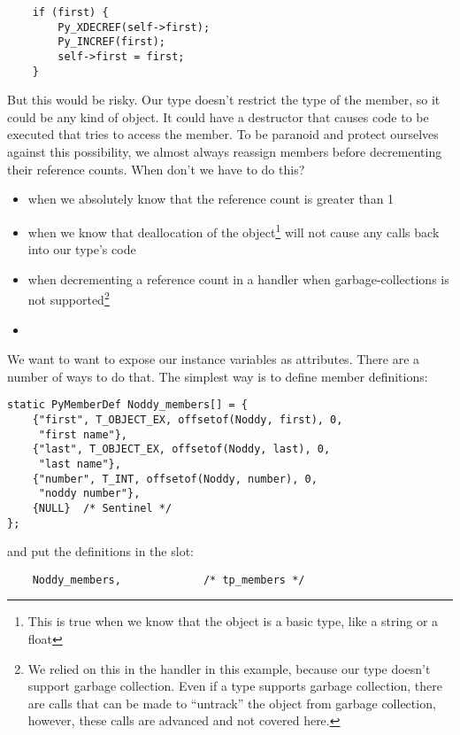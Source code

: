 \begin{verbatim}
    if (first) {
        Py_XDECREF(self->first);
        Py_INCREF(first);
        self->first = first;
    }
\end{verbatim}

But this would be risky.  Our type doesn't restrict the type of the
 member, so it could be any kind of object.  It could
have a destructor that causes code to be executed that tries to
access the  member.  To be paranoid and protect
ourselves against this possibility, we almost always reassign members
before decrementing their reference counts.  When don't we have to do
this?
\begin{itemize}
\item when we absolutely know that the reference count is greater than
  1
\item when we know that deallocation of the object\footnote{This is
  true when we know that the object is a basic type, like a string or
  a float} will not cause any
  calls back into our type's code
\item when decrementing a reference count in a 
  handler when garbage-collections is not supported\footnote{We relied
  on this in the  handler in this example, because
  our type doesn't support garbage collection. Even if a type supports
  garbage collection, there are calls that can be made to ``untrack''
  the object from garbage collection, however, these calls are
  advanced and not covered here.}
\item
\end{itemize}


We want to want to expose our instance variables as attributes. There
are a number of ways to do that. The simplest way is to define member
definitions:

\begin{verbatim}
static PyMemberDef Noddy_members[] = {
    {"first", T_OBJECT_EX, offsetof(Noddy, first), 0,
     "first name"},
    {"last", T_OBJECT_EX, offsetof(Noddy, last), 0,
     "last name"},
    {"number", T_INT, offsetof(Noddy, number), 0,
     "noddy number"},
    {NULL}  /* Sentinel */
};
\end{verbatim}

and put the definitions in the  slot:

\begin{verbatim}
    Noddy_members,             /* tp_members */
\end{verbatim}

